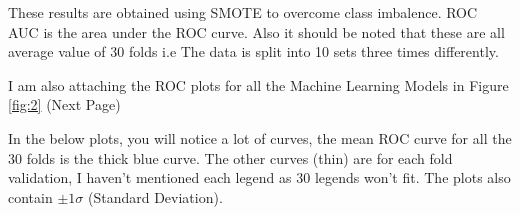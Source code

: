 \documentclass{article}
\begin{document}
\begin{info} %
	These results are obtained using SMOTE to overcome class imbalence. ROC AUC is the area under the ROC curve. Also it should be noted that these are all average value of 30 folds i.e The data is split into 10 sets three times differently.
\end{info}

I am also attaching the ROC plots for all the Machine Learning Models in Figure \ref{fig:2} (Next Page)

\begin{info} %
	In the below plots, you will notice a lot of curves, the mean ROC curve for all the 30 folds is the thick blue curve. The other curves (thin) are for each fold validation, I haven't mentioned each legend as 30 legends won't fit. The plots also contain  $\pm 1 \sigma$ (Standard Deviation).
\end{info}
\end{document}
